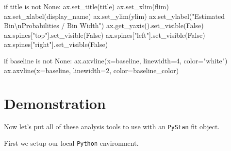 \documentclass[
  letterpaper,
  DIV=11,
  numbers=noendperiod]{scrartcl}
\newenvironment{Shaded}{\begin{snugshade}}{\end{snugshade}}
\newcommand{\CharTok}[1]{\textcolor[rgb]{0.13,0.47,0.30}{#1}}
\newcommand{\ControlFlowTok}[1]{\textcolor[rgb]{0.00,0.23,0.31}{#1}}
\newcommand{\DecValTok}[1]{\textcolor[rgb]{0.68,0.00,0.00}{#1}}
\newcommand{\KeywordTok}[1]{\textcolor[rgb]{0.00,0.23,0.31}{#1}}
\newcommand{\NormalTok}[1]{\textcolor[rgb]{0.00,0.23,0.31}{#1}}
\newcommand{\OperatorTok}[1]{\textcolor[rgb]{0.37,0.37,0.37}{#1}}
\newcommand{\StringTok}[1]{\textcolor[rgb]{0.13,0.47,0.30}{#1}}
\newcommand{\VariableTok}[1]{\textcolor[rgb]{0.07,0.07,0.07}{#1}}
\begin{document}
\begin{Shaded}
\begin{Highlighting}[]
    \ControlFlowTok{if}\NormalTok{ title }\KeywordTok{is} \KeywordTok{not} \VariableTok{None}\NormalTok{:}
\NormalTok{      ax.set\_title(title)}
\NormalTok{    ax.set\_xlim(flim)}
\NormalTok{    ax.set\_xlabel(display\_name)}
\NormalTok{    ax.set\_ylim(ylim)}
\NormalTok{    ax.set\_ylabel(}\StringTok{"Estimated Bin}\CharTok{\textbackslash{}n}\StringTok{Probabilities / Bin Width"}\NormalTok{)}
\NormalTok{    ax.get\_yaxis().set\_visible(}\VariableTok{False}\NormalTok{)}
\NormalTok{    ax.spines[}\StringTok{"top"}\NormalTok{].set\_visible(}\VariableTok{False}\NormalTok{)}
\NormalTok{    ax.spines[}\StringTok{"left"}\NormalTok{].set\_visible(}\VariableTok{False}\NormalTok{)}
\NormalTok{    ax.spines[}\StringTok{"right"}\NormalTok{].set\_visible(}\VariableTok{False}\NormalTok{)}

  \ControlFlowTok{if}\NormalTok{ baseline }\KeywordTok{is} \KeywordTok{not} \VariableTok{None}\NormalTok{:}
\NormalTok{    ax.axvline(x}\OperatorTok{=}\NormalTok{baseline, linewidth}\OperatorTok{=}\DecValTok{4}\NormalTok{, color}\OperatorTok{=}\StringTok{"white"}\NormalTok{)}
\NormalTok{    ax.axvline(x}\OperatorTok{=}\NormalTok{baseline, linewidth}\OperatorTok{=}\DecValTok{2}\NormalTok{, color}\OperatorTok{=}\NormalTok{baseline\_color)}
\end{Highlighting}
\end{Shaded}

\section{Demonstration}\label{demonstration}

Now let's put all of these analysis tools to use with an \texttt{PyStan}
fit object.

First we setup our local \texttt{Python} environment.
\end{document}
